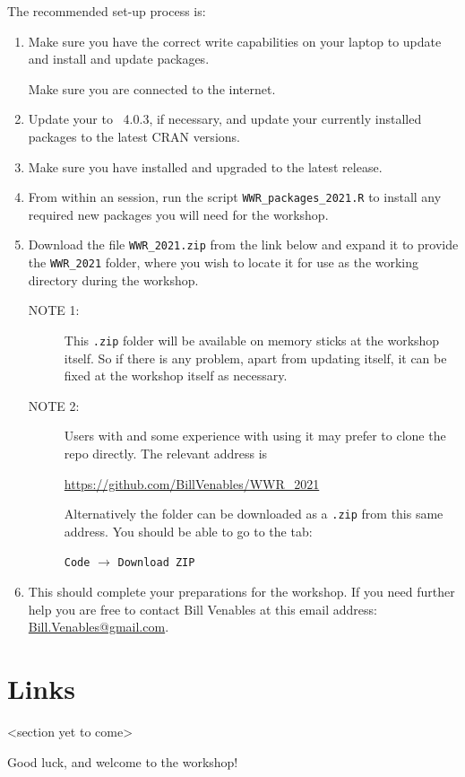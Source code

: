 \documentclass[12pt]{article}
\begin{document}
The recommended set-up process is:
  \begin{enumerate}
  \item Make sure you have the correct write capabilities on your
    laptop to update \R and install and update packages.

    Make sure you are connected to the internet.
  \item Update your \R to \R~4.0.3, if necessary, and update your
    currently installed packages to the latest CRAN versions.
    
  \item Make sure you have \RStudio installed and upgraded to the
    latest release.
    
  \item From within an \R session, run the script
    \verb|WWR_packages_2021.R| to install any required new packages
    you will need for the workshop.
    
  \item Download the file \verb|WWR_2021.zip| from the link below and
    expand it to provide the \verb|WWR_2021| folder, where you wish to
    locate it for use as the working directory during the workshop.
    \begin{description}
    \item[NOTE 1:] This {\tt .zip} folder will be
      available on memory sticks at the workshop itself.  So if there
      is any problem, apart from updating \R itself, it can be fixed
      at the workshop itself as necessary.
    \item[NOTE 2:] Users with \git and some experience with using it
      may prefer to clone the \github repo directly.  The
      relevant address is
      \begin{center}
        \url{https://github.com/BillVenables/WWR_2021}
      \end{center}
      Alternatively the folder can be downloaded as a \verb|.zip| from
      this same address.  You should be able to go to the tab:
      \begin{center}
        \texttt{Code} $\longrightarrow$ \texttt{Download ZIP}
      \end{center}

    \end{description}
  \item This should complete your preparations for the workshop.  If
    you need further help you are free to contact Bill Venables at
    this email address:
    \href{mailto:Bill.Venables@gmail.com}{Bill.Venables@gmail.com}.
 
  \end{enumerate}

        

\section{Links}
\label{sec:links}

<section yet to come>

Good luck, and welcome to the workshop!
\end{document}
